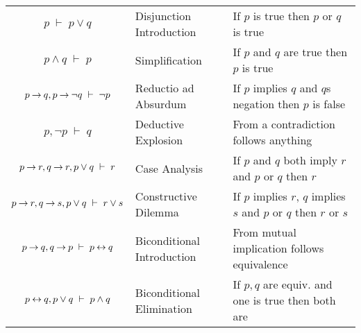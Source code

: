 \begin{tabular}{c l l}
  $p \;\vdash\; p \vee q$                                      & 
  Disjunction Introduction                                      & 
  If $p$ is true then $p$ or $q$ is true                        \\    
  
  $p \wedge q \;\vdash\; p$                                    & 
  Simplification                                                & 
  If $p$ and $q$ are true then $p$ is true                      \\    
  
  $p \mathbin{\rightarrow} q, p \mathbin{\rightarrow} \neg q \;\vdash\; \neg p$                & 
  Reductio ad Absurdum                                          & 
  If $p$ implies $q$ and $q$s negation then $p$ is false         \\ 
  
  $p, \neg p \;\vdash\; q$                                     & 
  Deductive Explosion                                           & 
  From a contradiction follows anything                         \\   
  
  $p \mathbin{\rightarrow} r, q \mathbin{\rightarrow} r, p \vee q \;\vdash\; r$                & 
  Case Analysis                                                 & 
  If $p$ and $q$ both imply $r$ and $p$ or $q$ then $r$         \\ 
  
  $p \mathbin{\rightarrow} r, q \mathbin{\rightarrow} s, p \vee q \;\vdash\; r \vee s$         & 
  Constructive Dilemma                                          & 
  If $p$ implies $r$, $q$ implies $s$ and $p$ or $q$ then $r$ or $s$         \\ 
  
  $p \mathbin{\rightarrow} q, q \mathbin{\rightarrow} p \;\vdash\; p \mathbin{\leftrightarrow} q$                & 
  Biconditional Introduction                                    & 
  From mutual implication follows equivalence                   \\   
  
  $p \mathbin{\leftrightarrow} q, p \vee q \;\vdash\; p \wedge q$                & 
  Biconditional Elimination                                     & 
  If $p,q$ are equiv. and one is true then both are         \\     
  
\end{tabular}
\medskip




